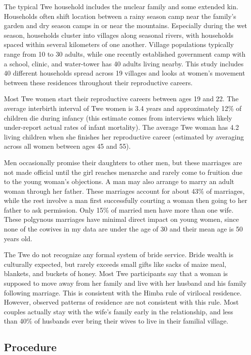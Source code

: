 \documentclass[10pt]{article}
\begin{document}
The typical Twe household includes the nuclear family and some extended kin.  Households often shift location between a rainy season camp near the family's garden and dry season camps in or near the mountains.  Especially during the wet season, households cluster into villages along seasonal rivers, with households spaced within several kilometers of one another.  Village populations typically range from 10 to 30 adults, while one recently established government camp with a school, clinic, and water-tower has 40 adults living nearby.  This study includes 40 different households spread across 19 villages and looks at women's movement between these residences throughout their reproductive careers.  

Most Twe women start their reproductive careers between ages 19 and 22.  The average interbirth interval of Twe women is 3.4 years and approximately 12\% of children die during infancy (this estimate comes from interviews which likely under-report actual rates of infant mortality).  The average Twe woman has 4.2 living children when she finishes her reproductive career (estimated by averaging across all women between ages 45 and 55).

Men occasionally promise their daughters to other men, but these marriages are not made official until the girl reaches menarche and rarely come to fruition due to the young woman's objections.  A man may also arrange to marry an adult woman through her father.  These marriages account for about 43\% of marriages, while the rest involve a man first successfully courting a woman then going to her father to ask permission.  Only 15\% of married men have more than one wife.  These polgynous marriages have minimal direct impact on young women, since none of the cowives in my data are under the age of 30 and their mean age is 50 years old.   

The Twe do not recognize any formal system of bride service.  Bride wealth is culturally expected, but rarely exceeds small gifts like sacks of maize meal, blankets, and buckets of honey.  Most Twe participants say that a woman is supposed to move away from her family and live with her husband and his family following marriage.  This is consistent with the Himba rule of virilocal residence. However, observed patterns of residence are not consistent with this rule.  Most couples actually stay with the wife's family early in the relationship, and less than 40\% of husbands ever bring their wives to live in their familial village.  

\subsection{Procedure}
\end{document}
